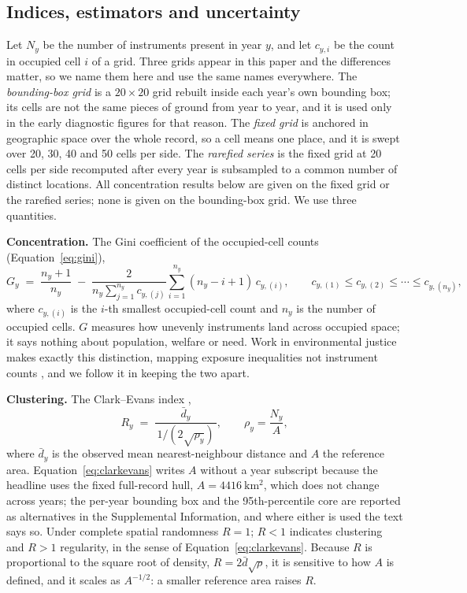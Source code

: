 \documentclass[fleqn,10pt,lineno]{wlpeerj}
\begin{document}
\subsection*{Indices, estimators and uncertainty}
\label{sec:indices}

Let $N_y$ be the number of instruments present in year $y$, and let $c_{y,i}$ be the
count in occupied cell $i$ of a grid. Three grids appear in this paper and the differences
matter, so we name them here and use the same names everywhere. The \emph{bounding-box
grid} is a $20\times20$ grid rebuilt inside each year's own bounding box; its cells are not
the same pieces of ground from year to year, and it is used only in the early diagnostic
figures for that reason. The \emph{fixed grid} is anchored in geographic space over the
whole record, so a cell means one place, and it is swept over 20, 30, 40 and 50 cells per
side. The \emph{rarefied series} is the fixed grid at 20 cells per side recomputed after
every year is subsampled to a common number of distinct locations. All concentration
results below are given on the fixed grid or the rarefied series; none is given on the
bounding-box grid. We use three quantities.

\noindent\textbf{Concentration.} The Gini coefficient \citep{gini1921measurement} of the
occupied-cell counts (Equation~\eqref{eq:gini}),
\begin{equation}
G_y \;=\; \frac{n_y+1}{n_y} \;-\; \frac{2}{n_y \sum_{j=1}^{n_y} c_{y,(j)}} \sum_{i=1}^{n_y} (n_y - i + 1)\, c_{y,(i)},
\qquad c_{y,(1)} \le c_{y,(2)} \le \cdots \le c_{y,(n_y)},
\label{eq:gini}
\end{equation}
where $c_{y,(i)}$ is the $i$-th smallest occupied-cell count and $n_y$ is the number of
occupied cells. $G$ measures how unevenly instruments land across occupied space; it
says nothing about population, welfare or need. Work
in environmental justice makes exactly this distinction, mapping exposure inequalities
not instrument counts
\citep{jiang2025environmental,alegria2024framework,karasaki2026geospatial}, and we follow
it in keeping the two apart.

\noindent\textbf{Clustering.} The Clark--Evans index \citep{clark1954distance},
\begin{equation}
R_y \;=\; \frac{\bar{d}_y}{\,1/(2\sqrt{\rho_y})\,},
\qquad
\rho_y = \frac{N_y}{A},
\label{eq:clarkevans}
\end{equation}
where $\bar{d}_y$ is the observed mean nearest-neighbour distance and $A$ the reference area.
Equation~\eqref{eq:clarkevans} writes $A$ without a year subscript because the headline uses the
fixed full-record hull, $A = \SI{4416}{\kilo\meter\squared}$, which does not change across years;
the per-year bounding box and the 95th-percentile core are reported as alternatives in
the Supplemental Information, and where either is used the text says so. Under complete spatial randomness
$R = 1$; $R < 1$ indicates
clustering and $R > 1$ regularity, in the sense of Equation~\eqref{eq:clarkevans}. Because $R$ is proportional to the square
root of density, $R = 2\bar{d}\sqrt{\rho}$, it is sensitive to how $A$ is defined, and it scales as $A^{-1/2}$: a smaller
reference area raises $R$.
\end{document}
